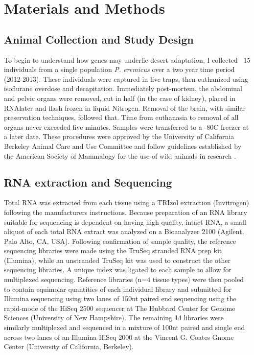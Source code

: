 \documentclass[11pt]{article}
\begin{document}
\section*{Materials and Methods}

\subsection*{Animal Collection and Study Design}

To begin to understand how genes may underlie desert adaptation, I collected ~15 individuals from a single population \textit{P. eremicus} over a two year time period (2012-2013). These individuals were captured in live traps, then euthanized using isoflurane overdose and decapitation. Immediately post-mortem, the abdominal and pelvic organs were removed, cut in half (in the case of kidney), placed in RNAlater and flash frozen in liquid Nitrogen. Removal of the brain, with similar preservation techniques, followed that. Time from euthanasia to removal of all organs never exceeded five minutes. Samples were transferred to a -80C freezer at a later date. These procedures were approved by the University of California Berkeley Animal Care and Use Committee and follow guidelines established by the American Society of Mammalogy for the use of wild animals in research \cite{Sikes:2011dz}.  

\subsection*{RNA extraction and Sequencing}

Total RNA was extracted from each tissue using a TRIzol extraction (Invitrogen) following the manufacturers instructions. Because preparation of an RNA library suitable for sequencing is dependent on having high
quality, intact RNA, a small aliquot of each total RNA extract was
analyzed on a Bioanalyzer 2100 (Agilent, Palo Alto, CA, USA).
Following confirmation of sample quality, the reference sequencing libraries
were made using the TruSeq stranded RNA prep kit
(Illumina), while an unstranded TruSeq kit was used to construct the other sequencing libraries. A unique index was ligated to each sample to allow for multiplexed sequencing. Reference libraries (n=4 tissue types) were then pooled to
contain equimolar quantities of each individual library and
submitted for Illumina sequencing using two lanes of 150nt paired end sequencing using the rapid-mode of the HiSeq 2500 sequencer at The Hubbard Center for Genome Sciences (University of New Hampshire). The remaining 14 libraries were similarly multiplexed and sequenced in a mixture of 100nt paired and single end across two lanes of an Illumina HiSeq 2000 at the Vincent G. Coates Gnome Center (University of California, Berkeley).
\end{document}
